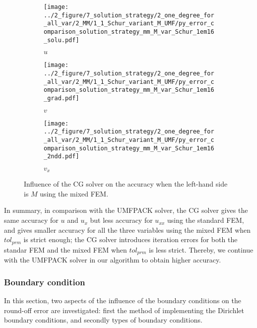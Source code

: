 \documentclass[review,3p]{elsarticle}
\begin{document}
\begin{figure}[!ht]
    \begin{subfigure}{5.5cm}
        \texttt{[image: ../2\_figure/7\_solution\_strategy/2\_one\_degree\_for\_all\_var/2\_MM/1\_1\_Schur\_variant\_M\_UMF/py\_error\_comparison\_solution\_strategy\_mm\_M\_var\_Schur\_1em16\_solu.pdf]}
        \caption{$u$}
        \label{py_bench_Pois_MM_error_solution_strategy_schur_1em16_M_variant_solu}
    \end{subfigure}
    \hspace{-0.2cm}
    \begin{subfigure}{5.5cm}
        \texttt{[image: ../2\_figure/7\_solution\_strategy/2\_one\_degree\_for\_all\_var/2\_MM/1\_1\_Schur\_variant\_M\_UMF/py\_error\_comparison\_solution\_strategy\_mm\_M\_var\_Schur\_1em16\_grad.pdf]}
        \caption{$v$}
        \label{py_bench_Pois_MM_error_solution_strategy_schur_1em16_M_variant_grad}
    \end{subfigure}
    \hspace{-0.2cm}
    \begin{subfigure}{5.5cm}
        \texttt{[image: ../2\_figure/7\_solution\_strategy/2\_one\_degree\_for\_all\_var/2\_MM/1\_1\_Schur\_variant\_M\_UMF/py\_error\_comparison\_solution\_strategy\_mm\_M\_var\_Schur\_1em16\_2ndd.pdf]}
        \caption{$v_x$}
        \label{py_bench_Pois_MM_error_solution_strategy_schur_1em16_M_variant_2ndd}
    \end{subfigure}
\caption{Influence of the CG solver on the accuracy when the left-hand side is $M$ using the mixed FEM.}
\label{py_bench_Pois_MM_error_solution_strategy_schur_1em16_M_variant}
\end{figure}

In summary, in comparison with the UMFPACK solver, the CG solver gives the same accuracy for $u$ and $u_{x}$ but less accuracy for $u_{xx}$ using the standard FEM, and gives smaller accuracy for all the three variables using the mixed FEM when $tol_{prm}$ is strict enough; the CG solver introduces iteration errors for both the standar FEM and the mixed FEM when $tol_{prm}$ is less strict. Thereby, we continue with the UMFPACK solver in our algorithm to obtain higher accuracy.


\subsubsection{Boundary condition}	\label{section_sensitivity_BC}

In this section, two aspects of the influence of the boundary conditions on the round-off error are investigated: first the method of implementing the Dirichlet boundary conditions, and secondly types of boundary conditions. 
\end{document}
